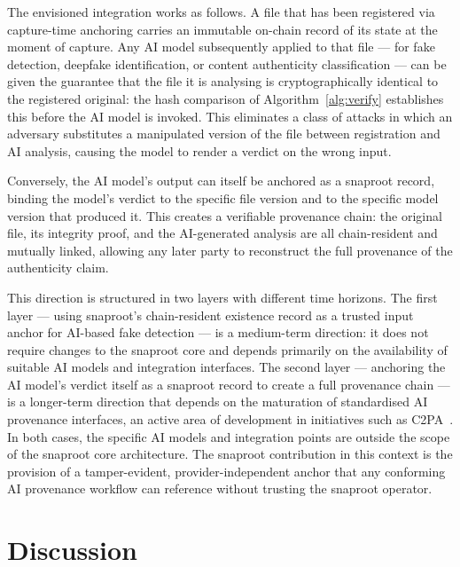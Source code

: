 \documentclass[11pt,a4paper]{article}
\begin{document}
The envisioned integration works as follows. A file that has been
registered via capture-time anchoring carries an immutable on-chain
record of its state at the moment of capture. Any AI model subsequently
applied to that file --- for fake detection, deepfake identification,
or content authenticity classification --- can be given the guarantee
that the file it is analysing is cryptographically identical to the
registered original: the hash comparison of Algorithm~\ref{alg:verify}
establishes this before the AI model is invoked. This eliminates a
class of attacks in which an adversary substitutes a manipulated
version of the file between registration and AI analysis, causing the
model to render a verdict on the wrong input.

Conversely, the AI model's output can itself be anchored as a
snaproot record, binding the model's verdict to the specific file
version and to the specific model version that produced it. This
creates a verifiable provenance chain: the original file, its
integrity proof, and the AI-generated analysis are all
chain-resident and mutually linked, allowing any later party to
reconstruct the full provenance of the authenticity claim.

This direction is structured in two layers with different time
horizons. The first layer --- using snaproot's chain-resident existence
record as a trusted input anchor for AI-based fake detection --- is a
medium-term direction: it does not require changes to the snaproot
core and depends primarily on the availability of suitable AI models
and integration interfaces. The second layer --- anchoring the AI
model's verdict itself as a snaproot record to create a full
provenance chain --- is a longer-term direction that depends on the
maturation of standardised AI provenance interfaces, an active area
of development in initiatives such as C2PA~\cite{c2pa2023spec}. In both
cases, the specific AI models and integration points are outside the
scope of the snaproot core architecture. The snaproot contribution in this context is the
provision of a tamper-evident, provider-independent anchor that any
conforming AI provenance workflow can reference without trusting the
snaproot operator.

\section{Discussion}
\label{sec:discussion}
\end{document}

